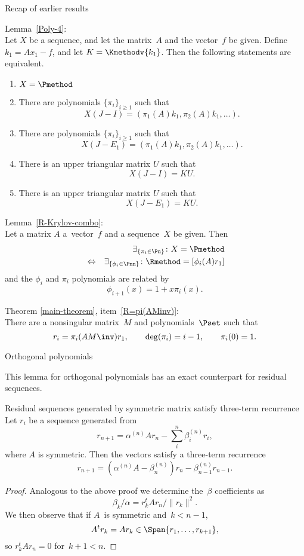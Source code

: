 \documentclass[11pt]{artikel3}
\begin{document}
\begin{Outline}
 {Recap of earlier results}

Lemma~\ref{Poly-4}:\\
Let $X$ be a sequence, and let the matrix~$A$ and the vector~$f$ be
given. Define $k_1=Ax_1-f$, and let $K=\Kmethodv{k_1}$.
Then the following statements are equivalent.
\begin{enumerate}
\item $X=\Pmethod$
\item
 There are polynomials $\{\pi_i\}_{i\geq1}$ such that
        \[ X(J-I)=(\pi_1(A)k_1,\pi_2(A)k_1,\ldots). \]
\item
 There are polynomials $\{\pi_i\}_{i\geq1}$ such that
        \[ X(J-E_1)=(\pi_1(A)k_1,\pi_2(A)k_1,\ldots). \]
\item
 There is an upper triangular matrix $U$ such that
        \[ X(J-I)=KU. \]
\item
 There is an upper triangular matrix $U$ such that
        \[ X(J-E_1)=KU. \]
\end{enumerate}

Lemma~\ref{R-Krylov-combo}:\\
Let a matrix $A$ a~vector~$f$ and a sequence~$X$ be given. Then
\begin{eqnarray*}
    &&\exists_{\{\pi_i\in\Pn\}}\colon X=\Pmethod\\
    &\Leftrightarrow&
    \exists_{\{\phi_i\in\Pnn\}}\colon\Rmethod=[\phi_i(A)r_1]
 \end{eqnarray*}
and the $\phi_i$ and $\pi_i$ polynomials are related by
\[ \phi_{i+1}(x)=1+x\pi_i(x). \]

Theorem \ref{main-theorem}, item~\ref{R=pi(AMinv)}:\\
There are a nonsingular matrix~$M$ and polynomials~$\Pset$
such that
        \[ r_i=\pi_i(AM\inv )r_1,\qquad
                {\rm deg}(\pi_i)=i-1,\qquad
                \pi_i(0)=1. \]

 {Orthogonal polynomials}



This lemma for orthogonal polynomials
has an exact counterpart for residual sequences.
\begin{llemma}{Residual sequences generated by symmetric matrix
satisfy three-term recurrence}
Let $r_i$ be a sequence generated from
\[ r_{n+1}=\alpha^{(n)}Ar_n-\sum^n_i\beta^{(n)}_ir_i, \]
where $A$ is symmetric. Then the vectors satisfy a three-term
recurrence
\[r_{n+1}=(\alpha^{(n)}A-\beta^{(n)}_n)r_n-\beta^{(n)}_{n-1}r_{n-1}.\]
\end{llemma}
\begin{proof}
Analogous to the above proof we determine the~$\beta$ coefficients
as \[ \beta_k/\alpha = r_k^tAr_n/\|r_k\|^2. \]
We then observe that if $A$~is symmetric and~$k<n-1$,
\[ A^tr_k=Ar_k\in\Span{r_1,\ldots,r_{k+1}}, \]
so $r_k^tAr_n=0$ for~$k+1<n$.
\end{proof}


\end{Outline}
\end{document}
